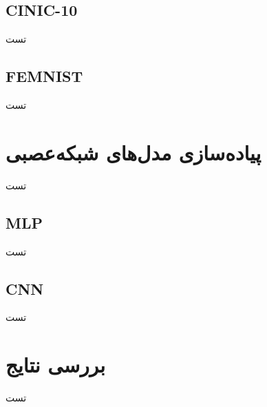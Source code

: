 %
%
%
%

\subsection{CINIC-10}
تست

\subsection{FEMNIST}
تست


\section{پیاده‌سازی مدل‌های شبکه‌عصبی}
تست

\subsection{MLP}
تست

\subsection{CNN}
تست



\section{بررسی نتایج}
تست



